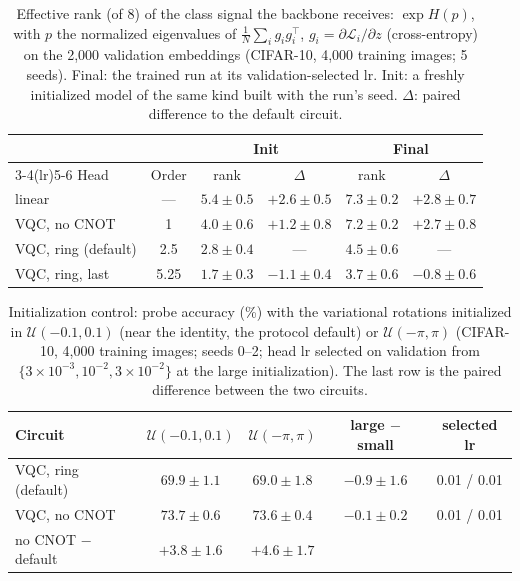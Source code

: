 \begin{table}[h]
\centering
\caption{Effective rank (of 8) of the class signal the backbone receives: $\exp H(p)$, with $p$
the normalized eigenvalues of $\frac1N\sum_i g_ig_i^\top$, $g_i=\partial\mathcal{L}_i/\partial z$
(cross-entropy) on the 2,000 validation embeddings (CIFAR-10, 4,000 training images; 5 seeds).
Final: the trained run at its validation-selected lr. Init: a freshly initialized model of the
same kind built with the run's seed. $\Delta$: paired difference to the default circuit.}
\label{tab:gradrank}
\small
\begin{tabular}{lccccc}
\toprule
& & \multicolumn{2}{c}{Init} & \multicolumn{2}{c}{Final} \\
\cmidrule(lr){3-4}\cmidrule(lr){5-6}
Head & Order & rank & $\Delta$ & rank & $\Delta$ \\
\midrule
linear & --- & $5.4 \pm 0.5$ & $+2.6 \pm 0.5$ & $7.3 \pm 0.2$ & $+2.8 \pm 0.7$ \\
VQC, no CNOT & 1 & $4.0 \pm 0.6$ & $+1.2 \pm 0.8$ & $7.2 \pm 0.2$ & $+2.7 \pm 0.8$ \\
VQC, ring (default) & 2.5 & $2.8 \pm 0.4$ & --- & $4.5 \pm 0.6$ & --- \\
VQC, ring, last & 5.25 & $1.7 \pm 0.3$ & $-1.1 \pm 0.4$ & $3.7 \pm 0.6$ & $-0.8 \pm 0.6$ \\
\bottomrule
\end{tabular}
\end{table}

\begin{table}[h]
\centering
\caption{Initialization control: probe accuracy (\%) with the variational rotations initialized
in $\mathcal{U}(-0.1,0.1)$ (near the identity, the protocol default) or $\mathcal{U}(-\pi,\pi)$
(CIFAR-10, 4,000 training images; seeds 0--2; head lr selected on validation from
$\{3\times10^{-3},10^{-2},3\times10^{-2}\}$ at the large initialization). The last row is the
paired difference between the two circuits.}
\label{tab:init}
\small
\begin{tabular}{lcccc}
\toprule
Circuit & $\mathcal{U}(-0.1,0.1)$ & $\mathcal{U}(-\pi,\pi)$ & large $-$ small & selected lr \\
\midrule
VQC, ring (default) & $69.9 \pm 1.1$ & $69.0 \pm 1.8$ & $-0.9 \pm 1.6$ & 0.01 / 0.01 \\
VQC, no CNOT & $73.7 \pm 0.6$ & $73.6 \pm 0.4$ & $-0.1 \pm 0.2$ & 0.01 / 0.01 \\
\midrule
no CNOT $-$ default & $+3.8 \pm 1.6$ & $+4.6 \pm 1.7$ & & \\
\bottomrule
\end{tabular}
\end{table}

